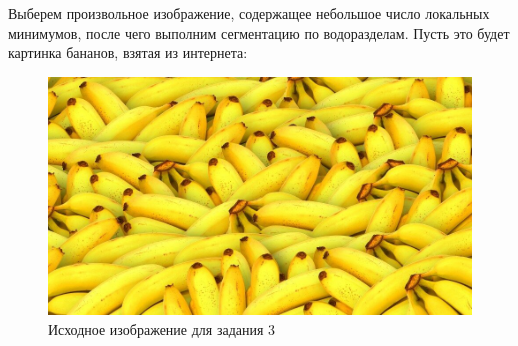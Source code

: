 \documentclass[a4paper, 12pt]{article}
\begin{document}
    Выберем произвольное изображение, содержащее небольшое число локальных минимумов, после чего выполним сегментацию
    по водоразделам. Пусть это будет картинка бананов, взятая из интернета:
    \begin{figure}[H]
        \centering
        \includegraphics[scale=0.2]{seg.jpg}
        \captionsetup{skip=0pt}
        \caption{Исходное изображение для задания 3}
        \label{fig:seg}
    \end{figure}
\end{document}

